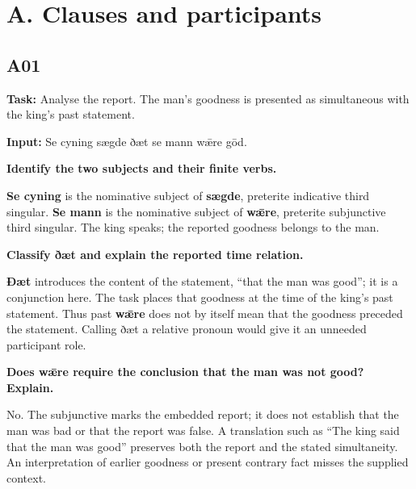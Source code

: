 \section*{A. Clauses and participants}

\subsection*{A01}

\textbf{Task:} Analyse the report. The man’s goodness is presented as simultaneous with the king’s past statement.

\textbf{Input:} Se cyning sægde ðæt se mann wǣre gōd.

\textbf{Identify the two subjects and their finite verbs.}

\textbf{Se cyning} is the nominative subject of \textbf{sægde}, preterite indicative third singular. \textbf{Se mann} is the nominative subject of \textbf{wǣre}, preterite subjunctive third singular. The king speaks; the reported goodness belongs to the man.

\textbf{Classify ðæt and explain the reported time relation.}

\textbf{Ðæt} introduces the content of the statement, “that the man was good”; it is a conjunction here. The task places that goodness at the time of the king's past statement. Thus past \textbf{wǣre} does not by itself mean that the goodness preceded the statement. Calling ðæt a relative pronoun would give it an unneeded participant role.

\textbf{Does wǣre require the conclusion that the man was not good? Explain.}

No. The subjunctive marks the embedded report; it does not establish that the man was bad or that the report was false. A translation such as “The king said that the man was good” preserves both the report and the stated simultaneity. An interpretation of earlier goodness or present contrary fact misses the supplied context.

